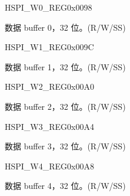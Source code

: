 \begin{register}{H}{SPI\_W0\_REG}{0x0098}\label{regdesc:SPIW0REG}
%
\regnewline%
\begin{regdesc}\begin{reglist}
\label{fielddesc:SPIBUF0}\item [SPI\_BUF0] 数据 buffer 0，32 位。(R/W/SS)
\end{reglist}\end{regdesc}
\end{register}


\begin{register}{H}{SPI\_W1\_REG}{0x009C}\label{regdesc:SPIW1REG}
%
\regnewline%
\begin{regdesc}\begin{reglist}
\label{fielddesc:SPIBUF1}\item [SPI\_BUF1] 数据 buffer 1，32 位。(R/W/SS)
\end{reglist}\end{regdesc}
\end{register}


\begin{register}{H}{SPI\_W2\_REG}{0x00A0}\label{regdesc:SPIW2REG}
%
\regnewline%
\begin{regdesc}\begin{reglist}
\label{fielddesc:SPIBUF2}\item [SPI\_BUF2] 数据 buffer 2，32 位。(R/W/SS)
\end{reglist}\end{regdesc}
\end{register}


\begin{register}{H}{SPI\_W3\_REG}{0x00A4}\label{regdesc:SPIW3REG}
%
\regnewline%
\begin{regdesc}\begin{reglist}
\label{fielddesc:SPIBUF3}\item [SPI\_BUF3] 数据 buffer 3，32 位。(R/W/SS)
\end{reglist}\end{regdesc}
\end{register}


\begin{register}{H}{SPI\_W4\_REG}{0x00A8}\label{regdesc:SPIW4REG}
%
\regnewline%
\begin{regdesc}\begin{reglist}
\label{fielddesc:SPIBUF4}\item [SPI\_BUF4] 数据 buffer 4，32 位。(R/W/SS)
\end{reglist}\end{regdesc}
\end{register}



